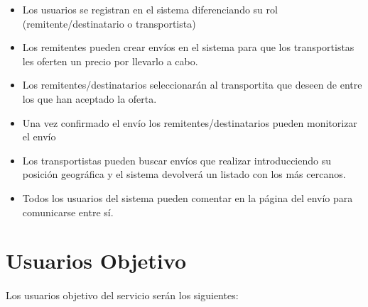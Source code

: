 \documentclass[10pt, a4paper,spanish]{article}
\begin{document}
			\begin{itemize}

				\item Los usuarios se registran en el sistema diferenciando su rol (remitente/destinatario o transportista)

				\item Los remitentes pueden crear envíos en el sistema para que los transportistas les oferten un precio por llevarlo a cabo.

				\item Los remitentes/destinatarios seleccionarán al transportita que deseen de entre los que han aceptado la oferta.

				\item Una vez confirmado el envío los remitentes/destinatarios pueden monitorizar el envío

				\item Los transportistas pueden buscar envíos que realizar introducciendo su posición geográfica y el sistema devolverá un listado con los más cercanos.

				\item Todos los usuarios del sistema pueden comentar en la página del envío para comunicarse entre sí.
			\end{itemize}



		\section{Usuarios Objetivo}

			\paragraph{}
			Los usuarios objetivo del servicio serán los siguientes:
\end{document}
